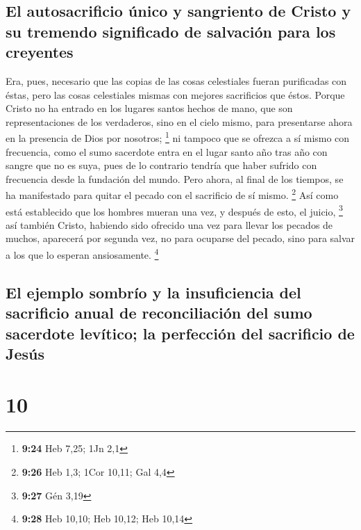 \hypertarget{el-autosacrificio-uxfanico-y-sangriento-de-cristo-y-su-tremendo-significado-de-salvaciuxf3n-para-los-creyentes}{%
\subsection{El autosacrificio único y sangriento de Cristo y su tremendo
significado de salvación para los
creyentes}\label{el-autosacrificio-uxfanico-y-sangriento-de-cristo-y-su-tremendo-significado-de-salvaciuxf3n-para-los-creyentes}}

 Era, pues, necesario que las copias de las cosas
celestiales fueran purificadas con éstas, pero las cosas celestiales
mismas con mejores sacrificios que éstos.  Porque Cristo
no ha entrado en los lugares santos hechos de mano, que son
representaciones de los verdaderos, sino en el cielo mismo, para
presentarse ahora en la presencia de Dios por nosotros; \footnote{\textbf{9:24}
  Heb 7,25; 1Jn 2,1}  ni tampoco que se ofrezca a sí
mismo con frecuencia, como el sumo sacerdote entra en el lugar santo año
tras año con sangre que no es suya,  pues de lo contrario
tendría que haber sufrido con frecuencia desde la fundación del mundo.
Pero ahora, al final de los tiempos, se ha manifestado para quitar el
pecado con el sacrificio de sí mismo. \footnote{\textbf{9:26} Heb 1,3;
  1Cor 10,11; Gal 4,4}  Así como está establecido que los
hombres mueran una vez, y después de esto, el juicio, \footnote{\textbf{9:27}
  Gén 3,19}  así también Cristo, habiendo sido ofrecido
una vez para llevar los pecados de muchos, aparecerá por segunda vez, no
para ocuparse del pecado, sino para salvar a los que lo esperan
ansiosamente. \footnote{\textbf{9:28} Heb 10,10; Heb 10,12; Heb 10,14}

\hypertarget{el-ejemplo-sombruxedo-y-la-insuficiencia-del-sacrificio-anual-de-reconciliaciuxf3n-del-sumo-sacerdote-levuxedtico-la-perfecciuxf3n-del-sacrificio-de-jesuxfas}{%
\subsection{El ejemplo sombrío y la insuficiencia del sacrificio anual
de reconciliación del sumo sacerdote levítico; la perfección del
sacrificio de
Jesús}\label{el-ejemplo-sombruxedo-y-la-insuficiencia-del-sacrificio-anual-de-reconciliaciuxf3n-del-sumo-sacerdote-levuxedtico-la-perfecciuxf3n-del-sacrificio-de-jesuxfas}}

\hypertarget{section-9}{%
\section{10}\label{section-9}}

